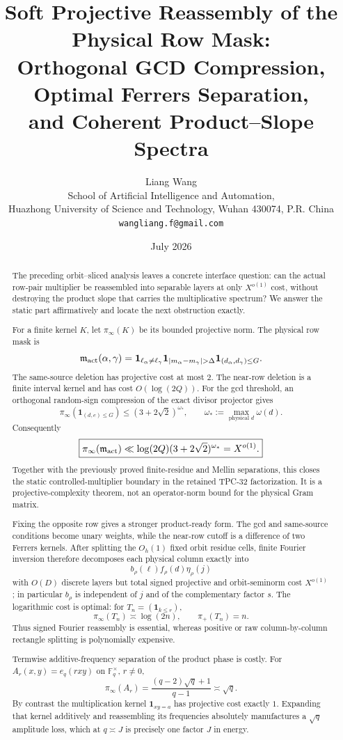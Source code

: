 \documentclass[11pt]{article}
\title{\textbf{Soft Projective Reassembly of the Physical Row Mask:}\\
\textbf{Orthogonal GCD Compression, Optimal Ferrers Separation,}\\
\textbf{and Coherent Product--Slope Spectra}}
\author{Liang Wang\\
\small School of Artificial Intelligence and Automation,\\[-0.2em]
\small Huazhong University of Science and Technology, Wuhan 430074, P.R. China\\
\small \texttt{wangliang.f@gmail.com}}
\date{July 2026}
\theoremstyle{definition}
\theoremstyle{remark}
\newcommand{\F}{\mathbb F}
\newcommand{\one}{\mathbf 1}
\newcommand{\pinf}{\pi_{\infty}}
\newcommand{\pplus}{\pi_{+}}
\begin{document}
\maketitle

\begin{abstract}
The preceding orbit--sliced analysis leaves a concrete interface question:
can the actual row-pair multiplier be reassembled into separable layers at
only \(X^{o(1)}\) cost, without destroying the product slope that carries
the multiplicative spectrum?  We answer the static part affirmatively and
locate the next obstruction exactly.

For a finite kernel \(K\), let \(\pinf(K)\) be its bounded projective norm.
The physical row mask is
\[
 \mathfrak m_{\rm act}(\alpha,\gamma)
 =\one_{\ell_\alpha\ne\ell_\gamma}
  \one_{|m_\alpha-m_\gamma|>\Delta}
  \one_{(d_\alpha,d_\gamma)\le G}.
\]
The same-source deletion has projective cost at most \(2\).  The near-row
deletion is a finite interval kernel and has cost \(O(\log(2Q))\).  For the
gcd threshold, an orthogonal random-sign compression of the exact divisor
projector gives
\[
 \pinf\!\left(\one_{(d,e)\le G}\right)
 \le(3+2\sqrt2)^{\omega_*},
 \qquad
 \omega_*:=\max_{\text{physical }d}\omega(d).
\]
Consequently
\[
 \boxed{
 \pinf(\mathfrak m_{\rm act})
 \ll\log(2Q)(3+2\sqrt2)^{\omega_*}=X^{o(1)}.}
\]
Together with the previously proved finite-residue and Mellin
separations, this closes the static controlled-multiplier boundary in the
retained TPC-32 factorization.  It is a projective-complexity theorem, not
an operator-norm bound for the physical Gram matrix.

Fixing the opposite row gives a stronger product-ready form.  The gcd and
same-source conditions become unary weights, while the near-row cutoff is
a difference of two Ferrers kernels.  After splitting the \(O_h(1)\)
fixed orbit residue cells, finite Fourier inversion therefore decomposes
each physical column exactly into
\[
 b_\rho(\ell)f_\rho(d)\eta_\rho(j)
\]
with \(O(D)\) discrete layers but total signed projective and orbit-seminorm
cost \(X^{o(1)}\); in particular \(b_\rho\) is independent of \(j\) and of
the complementary factor \(s\).  The logarithmic cost is optimal:
for \(T_n=(\one_{k\le r})\),
\[
 \pinf(T_n)\asymp\log(2n),
 \qquad
 \pplus(T_n)=n.
\]
Thus signed Fourier reassembly is essential, whereas positive or
raw column-by-column rectangle splitting is polynomially expensive.

Termwise additive-frequency separation of the product phase is costly.
For
\(A_r(x,y)=e_q(rxy)\) on \(\F_q^\times\), \(r\ne0\),
\[
 \boxed{
 \pinf(A_r)=\frac{(q-2)\sqrt q+1}{q-1}\asymp\sqrt q.}
\]
By contrast the multiplication kernel
\(\one_{xy=a}\) has projective cost exactly \(1\).  Expanding that kernel
additively and reassembling its frequencies absolutely manufactures a
\(\sqrt q\) amplitude loss, which at \(q\asymp J\) is precisely one factor
\(J\) in energy.


\end{abstract}
\end{document}
